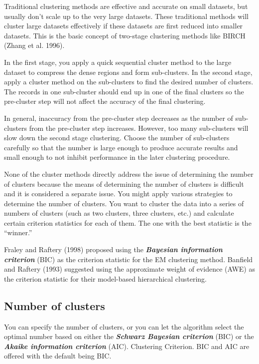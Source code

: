 Traditional clustering methods are effective and accurate on small datasets, but usually don’t scale up to the very large datasets. These traditional methods will cluster large
datasets effectively if these datasets are first reduced into smaller datasets. This is the basic concept of two-stage clustering methods like BIRCH (Zhang et al. 1996). 

In the first stage, you apply a quick sequential cluster method to the large dataset to compress the
dense regions and form sub-clusters. In the second stage, apply a cluster method on the sub-clusters to find the desired number of clusters. The records in one sub-cluster should
end up in one of the final clusters so the pre-cluster step will not affect the accuracy of the final clustering. 

In general, inaccuracy from the pre-cluster step decreases as the number of sub-clusters from the pre-cluster step increases. However, too many sub-clusters
will slow down the second stage clustering. Choose the number of sub-clusters carefully so that the number is large enough to produce accurate results and small enough to not inhibit performance in the later clustering procedure.

None of the cluster methods directly address the issue of determining the number of
clusters because the means of determining the number of clusters is difficult and it is
considered a separate issue. You might apply various strategies to determine the number
of clusters. You want to cluster the data into a series of numbers of clusters (such as two
clusters, three clusters, etc.) and calculate certain criterion statistics for each of them.
The one with the best statistic is the “winner.” 

Fraley and Raftery (1998) proposed using the \textit{\textbf{Bayesian information criterion}} (BIC) as the criterion statistic for the EM clustering
method. 
Banfield and Raftery (1993) suggested using the approximate weight of evidence (AWE) as the criterion statistic for their model-based hierarchical 
clustering.

\subsection{Number of clusters}
You can specify the number of clusters, or you can let the algorithm select the optimal number based on either the 
\textbf{\textit{Schwarz Bayesian criterion}} (BIC) or the \textbf{\textit{Akaike information criterion}} (AIC).
Clustering Criterion. BIC and AIC are offered with the default being BIC.

